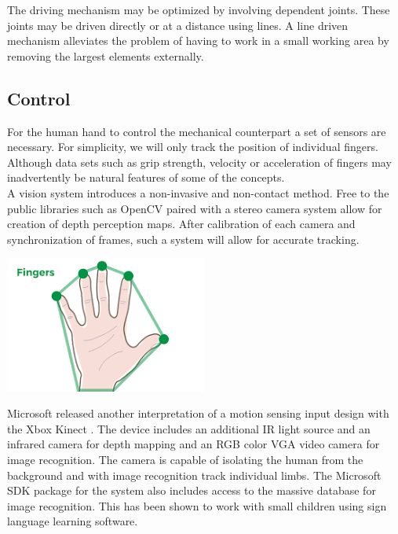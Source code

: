 \documentclass{article}
\begin{document}
The driving mechanism may be optimized by involving dependent joints. These joints may be driven directly or at a distance using lines. A line driven mechanism alleviates the problem of having to work in a small working area by removing the largest elements externally. 

\subsection{Control}
For the human hand to control the mechanical counterpart a set of sensors are necessary. For simplicity, we will only track the position of individual fingers. Although data sets such as grip strength, velocity or acceleration of fingers may inadvertently be natural features of some of the concepts.\\[12pt]
\indent A vision system introduces a non-invasive and non-contact method. Free to the public libraries such as OpenCV paired with a stereo camera system allow for creation of depth perception maps. After calibration of each camera and synchronization of frames, such a system will allow for accurate tracking.

\begin{center}
\includegraphics[width=0.5\textwidth]{IMG/HandSens.png}
\end{center}

\indent Microsoft released another interpretation of a motion sensing input design with the Xbox Kinect \cite{kinect}. The device includes an additional IR light source and an infrared camera for depth mapping and an RGB color VGA video camera for image recognition. The camera is capable of isolating the human from the background and with image recognition track individual limbs. The Microsoft SDK package for the system also includes access to the massive database for image recognition. This has been shown to work with small children using sign language learning software.
\end{document}
